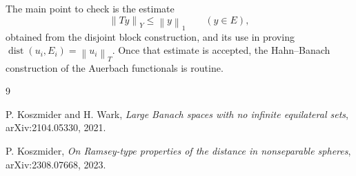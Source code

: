 \documentclass[11pt]{article}
\newcommand{\norm}[1]{\left\lVert #1 \right\rVert}
\begin{document}
The main point to check is the estimate
\[
  \norm{Ty}_Y\leq \norm{y}_1\qquad (y\in E),
\]
obtained from the disjoint block construction, and its use in proving
\(\operatorname{dist}(u_i,E_i)=\norm{u_i}_T\).  Once that estimate is
accepted, the Hahn--Banach construction of the Auerbach functionals is
routine.

\begin{thebibliography}{9}

P. Koszmider and H. Wark,
\emph{Large Banach spaces with no infinite equilateral sets},
arXiv:2104.05330, 2021.

P. Koszmider,
\emph{On Ramsey-type properties of the distance in nonseparable spheres},
arXiv:2308.07668, 2023.

\end{thebibliography}
\end{document}
